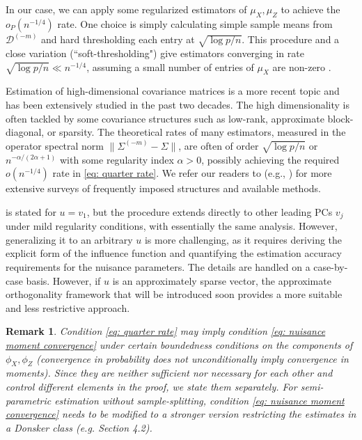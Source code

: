 \documentclass[11pt]{article}
\newtheorem{remark}{Remark}[section]
\begin{document}
In our case, we can apply some regularized estimators of $\mu_X, \mu_Z$ to achieve the $o_P(n^{-1/4})$ rate. One choice is simply calculating simple sample means from $\mathcal{D}^{(-m)}$ and hard thresholding each entry at $\sqrt{\log p/n}$. This procedure and a close variation (``soft-thresholding") give estimators converging in rate $\sqrt{\log p/n} \ll n^{-1/4}$, assuming a small number of entries of $\mu_X$ are non-zero \cite{johnstone2019gaussian}.

Estimation of high-dimensional covariance matrices is a more recent topic and has been extensively studied in the past two decades. The high dimensionality is often tackled by some covariance structures such as low-rank, approximate block-diagonal, or sparsity. The theoretical rates of many estimators, measured in the operator spectral norm $\|\Sigma^{(-m)} - \Sigma\|$, are often of order $\sqrt{\log p/n}$ or $n^{-\alpha/(2\alpha + 1)}$ with some regularity index $\alpha > 0$, possibly achieving the required $o(n^{-1/4})$ rate in \eqref{eq: quarter rate}. We refer our readers to (e.g., \cite{fan2016overview}) for more extensive surveys of frequently imposed structures and available methods.

 is stated for $u = v_1$, but the procedure extends directly to other leading PCs $v_j$ under mild regularity conditions, with essentially the same analysis. However, generalizing it to an arbitrary $u$ is more challenging, as it requires deriving the explicit form of the influence function and quantifying the estimation accuracy requirements for the nuisance parameters. The details are handled on a case-by-case basis. However, if $u$ is an approximately sparse vector, the approximate orthogonality framework that will be introduced soon provides a more suitable and less restrictive approach.

\begin{remark}
    Condition \eqref{eq: quarter rate} may imply condition \eqref{eq: nuisance moment convergence} under certain boundedness conditions on the components of $\phi_X,\phi_Z$ (convergence in probability does not unconditionally imply convergence in moments). Since they are neither sufficient nor necessary for each other and control different elements in the proof, we state them separately. For semi-parametric estimation without sample-splitting, condition \eqref{eq: nuisance moment convergence} needs to be modified to a stronger version restricting the estimates in a Donsker class (e.g. \cite{kennedy2022semiparametric} Section 4.2).
\end{remark}
\end{document}
